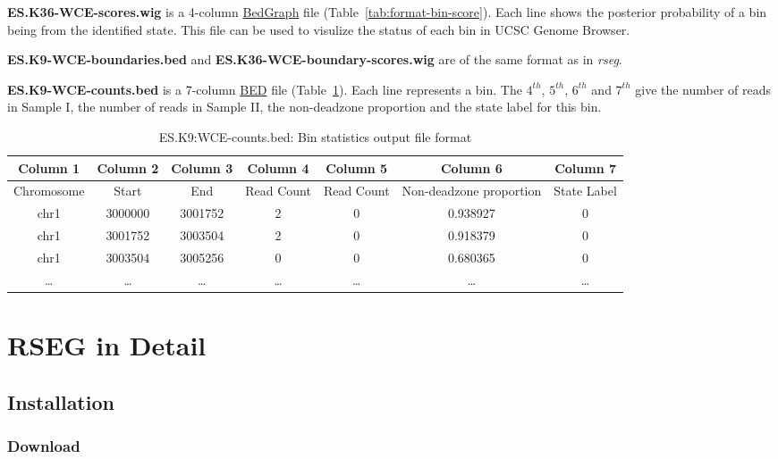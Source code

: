 \documentclass[11pt]{report}
\begin{document}
\textbf{ES.K36-WCE-scores.wig} is a 4-column
\href{http://genome.ucsc.edu/goldenPath/help/bedgraph.html}{BedGraph}
file (Table~\ref{tab:format-bin-score}). Each line shows the posterior
probability of a bin being from the identified state. This file can be
used to visulize the status of each bin in UCSC Genome Browser.

\textbf{ES.K9-WCE-boundaries.bed} and
\textbf{ES.K36-WCE-boundary-scores.wig} are of the same format as
in \textit{rseg}.

\textbf{ES.K9-WCE-counts.bed} is a 7-column
\href{http://genome.ucsc.edu/FAQ/FAQformat.html#format1}{BED} file
(Table~\ref{tab:format-bin-diff}). Each line represents a bin. The $4^{th}$,
$5^{th}$, $6^{th}$ and $7^{th}$ give the number of reads in Sample I, the number
of reads in Sample II, the non-deadzone proportion and the state label for this
bin.

\begin{table}[th]
  \centering
  \begin{tabular}{c c c c c c c }
    Column 1 & Column 2 & Column 3 &  Column 4 & Column 5 &  Column 6
    & Column 7\\
    \hline
    Chromosome  & Start & End & Read Count & Read Count & Non-deadzone proportion &
    State Label \\
    \hline
chr1&    3000000& 3001752& 2&       0&       0.938927&        0\\
chr1&    3001752& 3003504& 2&       0&       0.918379&        0\\
chr1&    3003504& 3005256& 0&       0&       0.680365&        0\\
    \ldots & \ldots &\ldots &\ldots &\ldots &\ldots & \ldots \\ 
    \hline
  \end{tabular}
  \caption{ES.K9:WCE-counts.bed: Bin statistics output file format}
  \label{tab:format-bin-diff}
\end{table}


\chapter{RSEG in Detail}
\label{chap:rseg-manual}

\section{Installation}
\label{sec:install}

\subsection*{Download}
\end{document}
